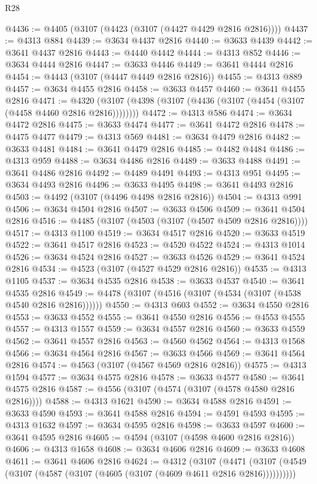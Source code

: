 \begin{lexlean}{R28}
\begin{coremodule}
@4436 := @4405 (@3107 (@4423 (@3107 (@4427 @4429 @2816 @2816))))
@4437 := @4313 @884
@4439 := @3634 @4437 @2816
@4440 := @3633 @4439
@4442 := @3641 @4437 @2816
@4443 := @4440 @4442
@4444 := @4313 @852
@4446 := @3634 @4444 @2816
@4447 := @3633 @4446
@4449 := @3641 @4444 @2816
@4454 := @4443 (@3107 (@4447 @4449 @2816 @2816))
@4455 := @4313 @889
@4457 := @3634 @4455 @2816
@4458 := @3633 @4457
@4460 := @3641 @4455 @2816
@4471 := @4320 (@3107 (@4398 (@3107 (@4436 (@3107 (@4454 (@3107 (@4458 @4460 @2816 @2816))))))))
@4472 := @4313 @586
@4474 := @3634 @4472 @2816
@4475 := @3633 @4474
@4477 := @3641 @4472 @2816
@4478 := @4475 @4477
@4479 := @4313 @569
@4481 := @3634 @4479 @2816
@4482 := @3633 @4481
@4484 := @3641 @4479 @2816
@4485 := @4482 @4484
@4486 := @4313 @959
@4488 := @3634 @4486 @2816
@4489 := @3633 @4488
@4491 := @3641 @4486 @2816
@4492 := @4489 @4491
@4493 := @4313 @951
@4495 := @3634 @4493 @2816
@4496 := @3633 @4495
@4498 := @3641 @4493 @2816
@4503 := @4492 (@3107 (@4496 @4498 @2816 @2816))
@4504 := @4313 @991
@4506 := @3634 @4504 @2816
@4507 := @3633 @4506
@4509 := @3641 @4504 @2816
@4516 := @4485 (@3107 (@4503 (@3107 (@4507 @4509 @2816 @2816))))
@4517 := @4313 @1100
@4519 := @3634 @4517 @2816
@4520 := @3633 @4519
@4522 := @3641 @4517 @2816
@4523 := @4520 @4522
@4524 := @4313 @1014
@4526 := @3634 @4524 @2816
@4527 := @3633 @4526
@4529 := @3641 @4524 @2816
@4534 := @4523 (@3107 (@4527 @4529 @2816 @2816))
@4535 := @4313 @1105
@4537 := @3634 @4535 @2816
@4538 := @3633 @4537
@4540 := @3641 @4535 @2816
@4549 := @4478 (@3107 (@4516 (@3107 (@4534 (@3107 (@4538 @4540 @2816 @2816))))))
@4550 := @4313 @603
@4552 := @3634 @4550 @2816
@4553 := @3633 @4552
@4555 := @3641 @4550 @2816
@4556 := @4553 @4555
@4557 := @4313 @1557
@4559 := @3634 @4557 @2816
@4560 := @3633 @4559
@4562 := @3641 @4557 @2816
@4563 := @4560 @4562
@4564 := @4313 @1568
@4566 := @3634 @4564 @2816
@4567 := @3633 @4566
@4569 := @3641 @4564 @2816
@4574 := @4563 (@3107 (@4567 @4569 @2816 @2816))
@4575 := @4313 @1594
@4577 := @3634 @4575 @2816
@4578 := @3633 @4577
@4580 := @3641 @4575 @2816
@4587 := @4556 (@3107 (@4574 (@3107 (@4578 @4580 @2816 @2816))))
@4588 := @4313 @1621
@4590 := @3634 @4588 @2816
@4591 := @3633 @4590
@4593 := @3641 @4588 @2816
@4594 := @4591 @4593
@4595 := @4313 @1632
@4597 := @3634 @4595 @2816
@4598 := @3633 @4597
@4600 := @3641 @4595 @2816
@4605 := @4594 (@3107 (@4598 @4600 @2816 @2816))
@4606 := @4313 @1658
@4608 := @3634 @4606 @2816
@4609 := @3633 @4608
@4611 := @3641 @4606 @2816
@4624 := @4312
    (@3107
      (@4471 (@3107 (@4549 (@3107 (@4587 (@3107 (@4605 (@3107 (@4609 @4611 @2816 @2816))))))))))

\end{coremodule}
\end{lexlean}
